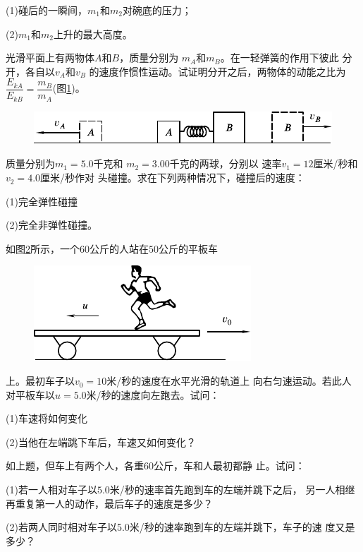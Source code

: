 \begin{exercises}
(1)碰后的一瞬间，$ m _ { 1 } $和$ m _ { 2 } $对碗底的压力；

(2)\;$ m _ { 1 } $和$ m _ { 2 } $上升的最大高度。

\exercise 光滑平面上有两物体$ A $和$ B $，质量分别为
$ m _ { A } $和$ m _ { B } $。在一轻弹簧的作用下彼此
分开，各自以$ v _ { A } $和$ v _ { B } $
的速度作惯性运动。试证明分开之后，两物体的动能之比为
$ \dfrac { E _ { k A } } { E _ { k B } } = \dfrac { m _ { B } } { m _ { A } } $(图\ref{fig:08.15})。
\begin{figure}[h]
  \centering
  \includegraphics{figure/fig08.15}
  \caption{}
  \label{fig:08.15}
\end{figure}

\exercise 质量分别为$ m _ { 1 } = 5.0 $千克和
$ m _ { 2 } = 3.00 $千克的两球，分别以
速率$ v _ { 1 } = 12 $厘米/秒和$ v _ { 2 } = 4.0 $厘米/秒作对
头碰撞。求在下列两种情况下，碰撞后的速度：

(1)完全弹性碰撞

(2)完全非弹性碰撞。

\exercise 如图\ref{fig:08.16}所示，一个$ 60 $公斤的人站在$ 50 $公斤的平板车
\begin{figure}
  \centering
  \includegraphics{figure/fig08.16}
  \caption{}
  \label{fig:08.16}
\end{figure}
上。最初车子以$ v _ { 0 } = 10 $米/秒的速度在水平光滑的轨道上
向右匀速运动。若此人对平板车以$ u=5.0 $米/秒的速度向左跑去。试问：

(1)车速将如何变化

(2)当他在左端跳下车后，车速又如何变化？

\exercise 如上题，但车上有两个人，各重$ 60 $公斤，车和人最初都静
止。试问：

(1)若一人相对车子以$ 5.0 $米/秒的速率首先跑到车的左端并跳下之后，
另一人相继再重复第一人的动作，最后车子的速度是多少？

(2)若两人同时相对车子以5.0米/秒的速率跑到车的左端并跳下，车子的速
度又是多少？


\end{exercises}

